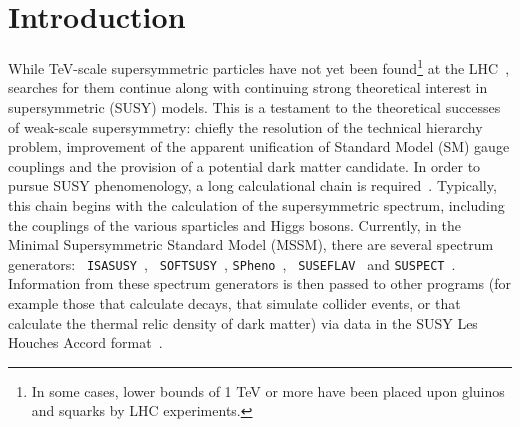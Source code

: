 \documentclass[final,3p,times]{elsarticle}
\begin{document}
\newpage

\section{Introduction}

While TeV-scale supersymmetric particles have not yet been found\footnote{In some
  cases, lower   bounds of 1 
TeV or more have been placed upon gluinos and squarks by LHC experiments.}
at the LHC~\cite{Aad:2013wta,CMSspart}, searches for them continue along with
continuing strong theoretical interest in supersymmetric (SUSY) models. 
This is a
testament to the 
theoretical successes of weak-scale supersymmetry: chiefly the resolution of
the technical hierarchy problem, improvement of the apparent unification of Standard
Model (SM) gauge couplings and the provision of a potential 
dark matter candidate. 
In order to pursue SUSY phenomenology, a long calculational chain is
required~\cite{Allanach:2008zn}. Typically, this chain begins with the
calculation of the 
supersymmetric spectrum, including the couplings of the various sparticles and
Higgs bosons. Currently, in the Minimal Supersymmetric Standard Model (MSSM), there
are several spectrum generators: {\tt
  ISASUSY}~\cite{Baer:1993ae}, {\tt 
  SOFTSUSY}~\cite{Allanach:2001kg}, {\tt   SPheno}~\cite{Porod:2003um}, {\tt
  SUSEFLAV}~\cite{Chowdhury:2011zr} and {\tt SUSPECT}~\cite{Djouadi:2002ze}. 
Information from these spectrum generators is then passed to other programs
(for example those that calculate decays, that simulate collider events, or
that calculate the thermal relic density of dark matter) via data in the SUSY
Les Houches Accord format~\cite{Skands:2003cj}.
\end{document}
